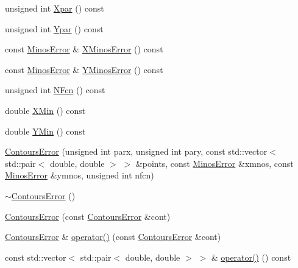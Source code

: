 \begin{DoxyCompactItemize}
\item 
unsigned int \mbox{\hyperlink{classROOT_1_1Minuit2_1_1ContoursError_a4f04b22b326b30c5a1bf3c0435544e8d}{Xpar}} () const
\item 
unsigned int \mbox{\hyperlink{classROOT_1_1Minuit2_1_1ContoursError_a3d118d7b9c49e6835130e0ce50b94b18}{Ypar}} () const
\item 
const \mbox{\hyperlink{classROOT_1_1Minuit2_1_1MinosError}{Minos\+Error}} \& \mbox{\hyperlink{classROOT_1_1Minuit2_1_1ContoursError_a0d14fdab181f06ddd1b38e7dc763718b}{X\+Minos\+Error}} () const
\item 
const \mbox{\hyperlink{classROOT_1_1Minuit2_1_1MinosError}{Minos\+Error}} \& \mbox{\hyperlink{classROOT_1_1Minuit2_1_1ContoursError_a7ca7b0f224597473592c8da5a5825d61}{Y\+Minos\+Error}} () const
\item 
unsigned int \mbox{\hyperlink{classROOT_1_1Minuit2_1_1ContoursError_a1342abcb15690e6897ad860e7f05026d}{N\+Fcn}} () const
\item 
double \mbox{\hyperlink{classROOT_1_1Minuit2_1_1ContoursError_ac0dbac1ec08765a632908c88c5f24822}{X\+Min}} () const
\item 
double \mbox{\hyperlink{classROOT_1_1Minuit2_1_1ContoursError_ac2bd4c328fe62d04b2809d9e0730efe3}{Y\+Min}} () const
\item 
\mbox{\hyperlink{classROOT_1_1Minuit2_1_1ContoursError_abe494ac0098e41bf38fd4023e018e340}{Contours\+Error}} (unsigned int parx, unsigned int pary, const std\+::vector$<$ std\+::pair$<$ double, double $>$ $>$ \&points, const \mbox{\hyperlink{classROOT_1_1Minuit2_1_1MinosError}{Minos\+Error}} \&xmnos, const \mbox{\hyperlink{classROOT_1_1Minuit2_1_1MinosError}{Minos\+Error}} \&ymnos, unsigned int nfcn)
\item 
\mbox{\hyperlink{classROOT_1_1Minuit2_1_1ContoursError_a712a4699d5a022af68106524be05d862}{$\sim$\+Contours\+Error}} ()
\item 
\mbox{\hyperlink{classROOT_1_1Minuit2_1_1ContoursError_a270e1882e03ca939a8a910f9c6f3cbeb}{Contours\+Error}} (const \mbox{\hyperlink{classROOT_1_1Minuit2_1_1ContoursError}{Contours\+Error}} \&cont)
\item 
\mbox{\hyperlink{classROOT_1_1Minuit2_1_1ContoursError}{Contours\+Error}} \& \mbox{\hyperlink{classROOT_1_1Minuit2_1_1ContoursError_a17f1d0a4579d605cd25da8e0e27bf4ba}{operator()}} (const \mbox{\hyperlink{classROOT_1_1Minuit2_1_1ContoursError}{Contours\+Error}} \&cont)
\item 
const std\+::vector$<$ std\+::pair$<$ double, double $>$ $>$ \& \mbox{\hyperlink{classROOT_1_1Minuit2_1_1ContoursError_ad73e9dd73b1b7480342dd523e78a8def}{operator()}} () const

\end{DoxyCompactItemize}
